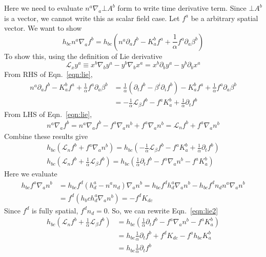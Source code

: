 \documentclass[prd]{revtex4}
\begin{document}
Here we need to evaluate $n^a \nabla_a \bot A^b$ form to write time derivative term. Since $\bot A^b$ is a vector, we cannot write this as scalar field case. Let $f^a$ be a arbitrary spatial vector. We want to show
\begin{equation}
\label{eqn:lie}
h_{bc} n^a \nabla_a f^b = h_{bc} (n^a \partial_a f^b - K^b_a f^a + \frac{1}{\alpha} f^a \partial_a \beta^b)
\end{equation}
To show this, using the definition of Lie derivative 
\begin{equation}
\mathcal{L}_x y^a \equiv x^b \nabla_b y^a - y^b \nabla_b x^a = x^b \partial_b y^a - y^b \partial_b x^a
\end{equation}
From RHS of Eqn.~\ref{eqn:lie},
\begin{align}
 n^a \partial_a f^b - K^b_a f^a + \frac{1}{\alpha} f^a \partial_a \beta^b &= \frac{1}{\alpha} ( \partial_t f^b - \beta^i \partial_i f^b) - K^b_a f^a + \frac{1}{\alpha} f^a \partial_a \beta^b \nonumber \\
 		&=-\frac{1}{\alpha} \mathcal{L}_{\beta} f^b - f^a K_a^b +\frac{1}{\alpha} \partial_t f^b \nonumber
\end{align}
From LHS of Eqn.~\ref{eqn:lie},
\begin{align}
n^a \nabla_a f^b = n^a \nabla_a f^b - f^a \nabla_a n^b + f^a \nabla_a n^b = \mathcal{L}_n f^b + f^a \nabla_a n^b \nonumber
\end{align}
Combine these results give
\begin{align}
h_{bc} (\mathcal{L}_n f^b + f^a \nabla_a n^b) = h_{bc} (-\frac{1}{\alpha} \mathcal{L}_{\beta} f^b - f^a K_a^b +\frac{1}{\alpha} \partial_t f^b) \nonumber \\
h_{bc} ( \mathcal{L}_n f^b + \frac{1}{\alpha} \mathcal{L}_\beta f^b) = h_{bc} (\frac{1}{\alpha} \partial_t f^b - f^a \nabla_a n^b - f^a K^b_a) \label{eqn:lie2}
\end{align}
Here we evaluate
\begin{align}
h_{bc} f^a \nabla_a n^b &= h_{bc} f^d (h^a_d - n^a n_d) \nabla_a n^b = h_{bc} f^d h^a_d \nabla_a n^b - h_{bc} f^d n_d n^a \nabla_a n^b \nonumber \\
				     &= f^d (h_bc h^a_d \nabla_a n^b) = - f^d K_{dc}
\end{align}
Since $f^d$ is fully spatial, $f^d n_d = 0$. So, we can rewrite Eqn.~\ref{eqn:lie2}
\begin{align}
h_{bc} ( \mathcal{L}_n f^b + \frac{1}{\alpha} \mathcal{L}_\beta f^b) &= h_{bc} (\frac{1}{\alpha} \partial_t f^b - f^a \nabla_a n^b - f^a K^b_a) \nonumber \\
											   	&=h_{bc} \frac{1}{\alpha} \partial_t f^b + f^d K_{dc} - f^a h_{bc} K^b_a \nonumber \\
												&=h_{bc} \frac{1}{\alpha} \partial_t f^b
\end{align}
\end{document}
